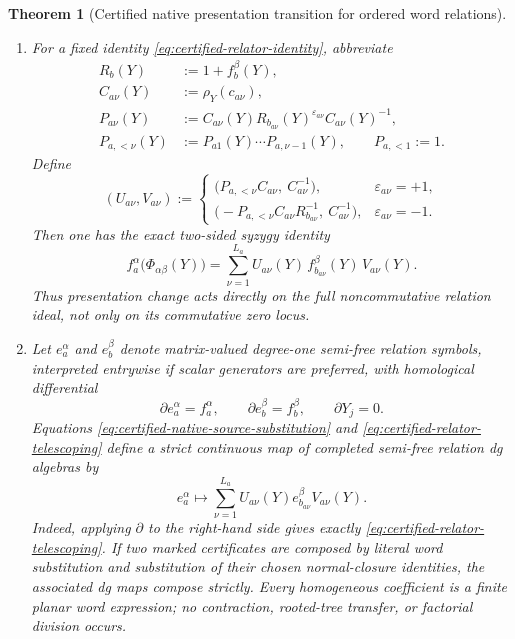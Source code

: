 \documentclass[11pt]{article}
\newtheorem{theorem}{Theorem}[section]
\theoremstyle{definition}
\begin{document}
\begin{theorem}[Certified native presentation transition for ordered word relations]
\begin{enumerate}[label=\textnormal{(\roman*)}]
\item For a fixed identity \eqref{eq:certified-relator-identity}, abbreviate
\begin{align*}
 R_b(Y)&:=1+f_b^\beta(Y),\\
 C_{a\nu}(Y)&:=\rho_Y(c_{a\nu}),\\
 P_{a\nu}(Y)&:=
 C_{a\nu}(Y)R_{b_{a\nu}}(Y)^{\varepsilon_{a\nu}}
 C_{a\nu}(Y)^{-1},\\
 P_{a,<\nu}(Y)&:=P_{a1}(Y)\cdots P_{a,\nu-1}(Y),
 \qquad P_{a,<1}:=1.
\end{align*}
Define
\begin{equation}\label{eq:certified-relator-U-V}
 (U_{a\nu},V_{a\nu})
 :=
 \begin{cases}
 \bigl(P_{a,<\nu}C_{a\nu},\ C_{a\nu}^{-1}\bigr),
 &\varepsilon_{a\nu}=+1,\\[3pt]
 \bigl(-P_{a,<\nu}C_{a\nu}R_{b_{a\nu}}^{-1},\ C_{a\nu}^{-1}\bigr),
 &\varepsilon_{a\nu}=-1.
 \end{cases}
\end{equation}
Then one has the exact two-sided syzygy identity
\begin{equation}\label{eq:certified-relator-telescoping}
 \boxed{
 f_a^\alpha\bigl(\Phi_{\alpha\beta}(Y)\bigr)
 =\sum_{\nu=1}^{L_a}
 U_{a\nu}(Y)\,
 f_{b_{a\nu}}^\beta(Y)\,
 V_{a\nu}(Y).
 }
\end{equation}
Thus presentation change acts directly on the full noncommutative relation
ideal, not only on its commutative zero locus.

\item Let $e_a^\alpha$ and $e_b^\beta$ denote matrix-valued degree-one
semi-free relation symbols, interpreted entrywise if scalar generators are
preferred, with homological differential
\[
 \partial e_a^\alpha=f_a^\alpha,
 \qquad
 \partial e_b^\beta=f_b^\beta,
 \qquad
 \partial Y_j=0.
\]
Equations \eqref{eq:certified-native-source-substitution} and
\eqref{eq:certified-relator-telescoping} define a strict continuous map of
completed semi-free relation dg algebras by
\begin{equation}\label{eq:certified-relation-dga-map}
 e_a^\alpha
 \longmapsto
 \sum_{\nu=1}^{L_a}
 U_{a\nu}(Y)e_{b_{a\nu}}^\beta V_{a\nu}(Y).
\end{equation}
Indeed, applying $\partial$ to the right-hand side gives exactly
\eqref{eq:certified-relator-telescoping}.  If two marked certificates are
composed by literal word substitution and substitution of their chosen
normal-closure identities, the associated dg maps compose strictly.  Every
homogeneous coefficient is a finite planar word expression; no contraction,
rooted-tree transfer, or factorial division occurs.


\end{enumerate}
\end{theorem}
\end{document}
